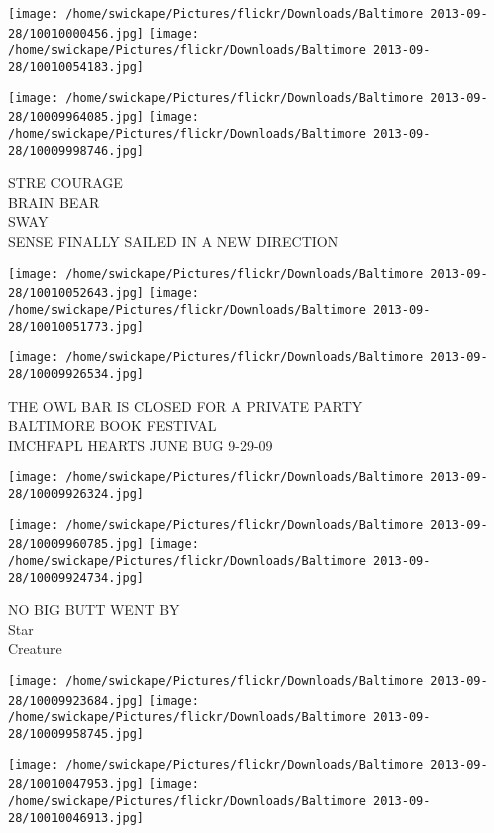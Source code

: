 \documentclass[10pt,letterpaper]{article}
\begin{document}
\texttt{[image: /home/swickape/Pictures/flickr/Downloads/Baltimore 2013-09-28/10010000456.jpg]}
\texttt{[image: /home/swickape/Pictures/flickr/Downloads/Baltimore 2013-09-28/10010054183.jpg]}

\texttt{[image: /home/swickape/Pictures/flickr/Downloads/Baltimore 2013-09-28/10009964085.jpg]}
\texttt{[image: /home/swickape/Pictures/flickr/Downloads/Baltimore 2013-09-28/10009998746.jpg]}

STRE COURAGE\\
BRAIN BEAR\\
SWAY\\
SENSE FINALLY SAILED IN A NEW DIRECTION
\pagebreak

\texttt{[image: /home/swickape/Pictures/flickr/Downloads/Baltimore 2013-09-28/10010052643.jpg]}
\texttt{[image: /home/swickape/Pictures/flickr/Downloads/Baltimore 2013-09-28/10010051773.jpg]}

\vspace{0.25in}
\texttt{[image: /home/swickape/Pictures/flickr/Downloads/Baltimore 2013-09-28/10009926534.jpg]}

THE OWL BAR IS CLOSED FOR A PRIVATE PARTY\\
BALTIMORE BOOK FESTIVAL\\
IMCHFAPL HEARTS JUNE BUG 9{-}29{-}09
\pagebreak

\texttt{[image: /home/swickape/Pictures/flickr/Downloads/Baltimore 2013-09-28/10009926324.jpg]}

\vspace{0.25in}
\texttt{[image: /home/swickape/Pictures/flickr/Downloads/Baltimore 2013-09-28/10009960785.jpg]}
\texttt{[image: /home/swickape/Pictures/flickr/Downloads/Baltimore 2013-09-28/10009924734.jpg]}

NO BIG BUTT WENT BY\\
Star\\
Creature
\pagebreak

\texttt{[image: /home/swickape/Pictures/flickr/Downloads/Baltimore 2013-09-28/10009923684.jpg]}
\texttt{[image: /home/swickape/Pictures/flickr/Downloads/Baltimore 2013-09-28/10009958745.jpg]}

\texttt{[image: /home/swickape/Pictures/flickr/Downloads/Baltimore 2013-09-28/10010047953.jpg]}
\texttt{[image: /home/swickape/Pictures/flickr/Downloads/Baltimore 2013-09-28/10010046913.jpg]}
\end{document}
